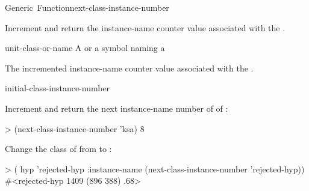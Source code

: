 \documentclass[10pt,twoside,english,pdftex]{article}
\begin{document}
\begin{functiondoc}{Generic~Function}{next-class-instance-number}%
  { 
    \returns{} }
%
%

\fnsyntax

\fnpurpose Increment and return the instance-name counter value
associated with the .

\fnmethods
{}%
  {\code{(} 
  \returns{} } 
%
  {\code{(} 
  \returns{} }

\fnpackage {}

\fnmodule {}

\fnargs
\begin{args}{unit-class-or-name}
 A  or a symbol naming a
\end{args}

\fnreturns The incremented instance-name counter value
associated with the .

\begin{alsos}{initial-class-instance-number}
\end{alsos}

\fnexamples
%
Increment and return the next instance-name number of 
of :
%
\W\supp
\begin{example}
> (next-class-instance-number 'ksa)
8
\end{example} 

%
%
Change the class of   from
 to :
%
\W\supp
\begin{example}
> ( hyp 'rejected-hyp 
    :instance-name (next-class-instance-number 'rejected-hyp))
#<rejected-hyp 1409 (896 388) .68>
\end{example} 

\end{functiondoc}

\end{document}
